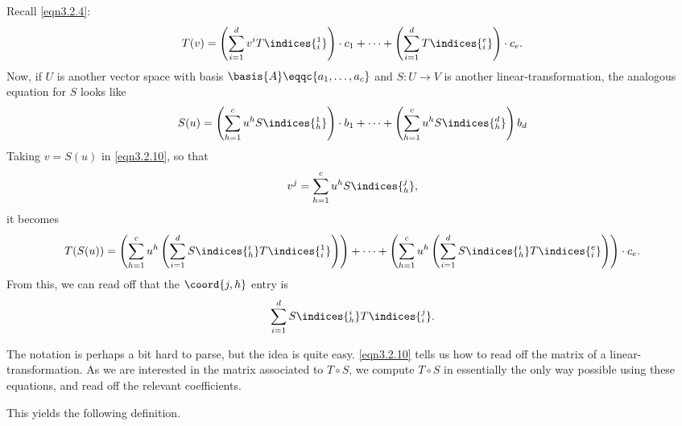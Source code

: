 Recall \eqref{eqn3.2.4}:
\begin{equation}\label{eqn3.2.10}
T(v)=\left( \sum _{i=1}^dv^iT\indices{^1_i}\right) \cdot c_1+\cdots +\left( \sum _{i=1}^dT\indices{^e_i}\right) \cdot c_e.
\end{equation}
Now, if $U$ is another vector space with basis $\basis{A}\eqqc \{ a_1,\ldots ,a_c\}$ and $S\colon U\rightarrow V$ is another linear-transformation, the analogous equation for $S$ looks like
\begin{equation}
	S(u)=\left( \sum _{h=1}^cu^hS\indices{^1_h}\right) \cdot b_1+\cdots +\left( \sum _{h=1}^cu^hS\indices{^d_h}\right) b_d
\end{equation}
Taking $v=S(u)$ in \eqref{eqn3.2.10}, so that
\begin{equation}
	v^j=\sum _{h=1}^cu^hS\indices{^j_h},
\end{equation}
it becomes
\begin{equation}
	T(S(u))=\left( \sum _{h=1}^cu^h\left( \sum _{i=1}^dS\indices{^i_h}T\indices{^1_i}\right) \right) +\cdots +\left( \sum _{h=1}^cu^h\left( \sum _{i=1}^dS\indices{^i_h}T\indices{^e_i}\right) \right) \cdot c_e.
\end{equation}
From this, we can read off that the $\coord{j,h}$ entry is
\begin{equation}
	\sum _{i=1}^dS\indices{^i_h}T\indices{^j_i}.
\end{equation}
\begin{rmk}
	The notation is perhaps a bit hard to parse, but the idea is quite easy.  \eqref{eqn3.2.10} tells us how to read off the matrix of a linear-transformation.  As we are interested in the matrix associated to $T\circ S$, we compute $T\circ S$ in essentially the only way possible using these equations, and read off the relevant coefficients.
\end{rmk}
This yields the following definition.
